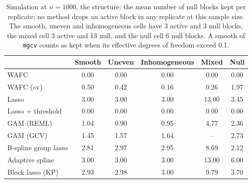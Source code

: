 \begin{table}[tp]
\caption{Simulation at $n = 1000$, the structure: the mean number of null blocks kept per replicate; no method drops an active block in any replicate at this sample size. The smooth, uneven and inhomogeneous cells have 3 active and 3 null blocks, the mixed cell 3 active and 13 null, and the null cell 6 null blocks. A smooth of \texttt{mgcv} counts as kept when its effective degrees of freedom exceed 0.1.}
\label{tab:sim-structure}
\centering
\small
\setlength{\tabcolsep}{6pt}
\begin{tabular}{lccccc}
\hline
 & Smooth & Uneven & Inhomogeneous & Mixed & Null \\
\hline
WAFC & 0.00 & 0.00 & 0.00 & 0.00 & 0.00 \\
WAFC (cv) & 0.50 & 0.42 & 0.16 & 0.26 & 1.97 \\
Lasso & 3.00 & 3.00 & 3.00 & 13.00 & 3.45 \\
Lasso + threshold & 0.00 & 0.00 & 0.00 & 0.00 & 0.00 \\
GAM (REML) & 1.04 & 0.90 & 0.95 & 4.77 & 2.36 \\
GAM (GCV) & 1.45 & 1.57 & 1.64 & -- & 2.73 \\
B-spline group lasso & 2.81 & 2.97 & 2.95 & 8.69 & 2.12 \\
Adaptive spline & 3.00 & 3.00 & 3.00 & 13.00 & 6.00 \\
Block lasso (KP) & 2.93 & 2.98 & 3.00 & 9.79 & 3.70 \\
\hline
\end{tabular}
\end{table}


